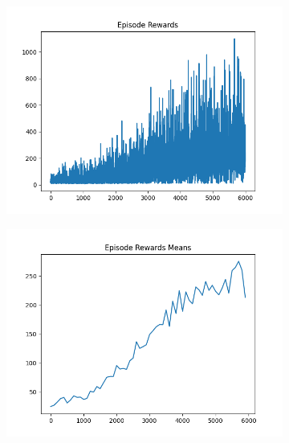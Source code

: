 \begin{figure}[H]
\begin{subfigure}{.47\linewidth}
        \includegraphics[width=\textwidth]{pole/2024-06-13_22-09-48_dqn_cartpole_episode_rewards.png}
    \end{subfigure}
    \begin{subfigure}{.47\linewidth}
        \centering
        \includegraphics[width=\textwidth]{pole/2024-06-13_22-09-48_dqn_cartpole_episode_rewards_means.png}
    \end{subfigure}
\end{figure}

